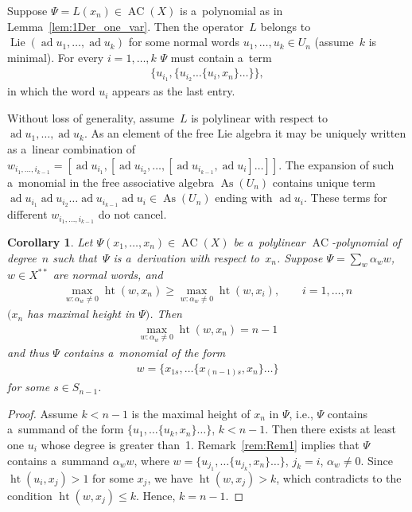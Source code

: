 \documentclass[11pt]{article}
\newtheorem{corollary}{Corollary}
\DeclareMathOperator{\ad}{ad}
\begin{document}
\begin{remark}
\label{rem:Rem1}
Suppose $\Psi=L(x_n)\in \operatorname{AC}(X) $ is a~polynomial as in Lemma~\ref{lem:1Der_one_var}.
Then the operator~$L$ belongs to $\operatorname{Lie}(\ad u_1,\dots, \ad u_k)$ for some normal words $u_1,\dots, u_k
\in U_n$ (assume~$k$ is minimal).
For every $i=1,\dots, k$ $\Psi $ must contain a~term
\begin{gather*}
\{u_{i_1},\{u_{i_2} \dots\{u_{i},x_n\}\dots \}\},
\end{gather*}
in which the word $u_i$ appears as the last entry.
\end{remark}

Without loss of generality, assume~$L$ is polylinear with respect to $\ad u_1, \dots, \ad u_k$.
As an element of the free Lie algebra it may be uniquely written as a~linear combination of $w_{i_1,\dots, i_{k-1}} =
[\ad u_{i_1}, [\ad u_{i_2}, \dots, [\ad u_{i_{k-1}}, \ad u_i]\dots]]$.
The expansion of such a~monomial in the free associative algebra $\operatorname{As}(U_n)$ contains unique term $\ad u_{i_1}
\ad u_{i_2} \dots \ad u_{i_{k-1}} \ad u_i\in \operatorname{As}(U_n)$ ending with $\ad u_i$.
These terms for dif\/ferent $w_{i_1,\dots, i_{k-1}}$ do not cancel.

\begin{corollary}
\label{cor:ACformDer}
Let $\Psi(x_1,\dots, x_n) \in \operatorname{AC}(X)$ be a~polylinear $\operatorname{AC}$-poly\-no\-mi\-al of degree~$n$ such that~$\Psi $ is a~derivation
with respect to~$x_n$.
Suppose $\Psi = \sum\limits_{w} \alpha_w w$, $w\in X^{**}$ are normal words, and
\begin{gather*}
\max\limits_{w:\alpha_w\ne 0} \operatorname{ht}(w,x_n)\ge \max\limits_{w:\alpha_w\ne 0} \operatorname{ht}(w,x_i),
\qquad
i=1,\dots, n
\end{gather*}
$(x_n$ has maximal height in $\Psi)$.
Then
\begin{gather*}
\max\limits_{w:\alpha_w\ne 0} \operatorname{ht}(w,x_n) = n-1
\end{gather*}
and thus $\Psi $ contains a~monomial of the form
\begin{gather*}
w = \{x_{1s}, \dots \{x_{(n-1)s}, x_n\}\dots \}
\end{gather*}
for some $s\in S_{n-1}$.
\end{corollary}

\begin{proof}
Assume $k<n-1$ is the maximal height of $x_n$ in $\Psi $, i.e., $\Psi $ contains a~summand of the form $\{u_{1}, \dots
\{u_{k},x_n\}\dots \}$, $k<n-1$.
Then there exists at least one $u_i$ whose degree is greater than~1.
Remark~\ref{rem:Rem1} implies that $\Psi $ contains a~summand $\alpha_w w$, where $w = \{u_{j_1},\dots\{u_{j_k},x_n\}\dots \}$, $j_k=i$,
$\alpha_w\ne 0$.
Since $\operatorname{ht}(u_i,x_j)>1$ for some $x_j$, we have $\operatorname{ht}(w,x_j)>k$, which contradicts to the condition $\operatorname{ht}(w,x_j)\le k$.
Hence, $k=n-1$.
\end{proof}
\end{document}
